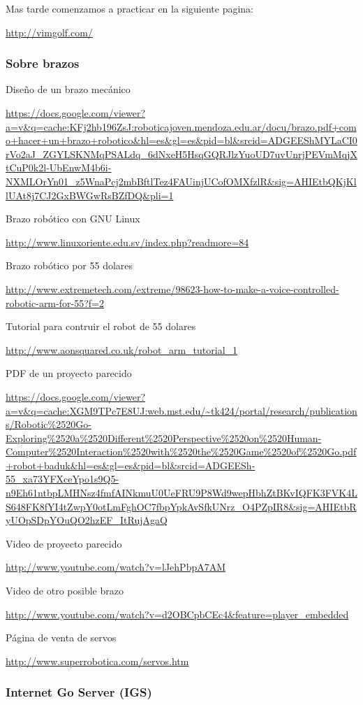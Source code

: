 \documentclass[12pt,a4paper]{report}
\begin{document}
Mas tarde comenzamos a practicar en la siguiente pagina:

\url{http://vimgolf.com/}

\subsubsection{Sobre brazos}

Diseño de un brazo mecánico

\url{https://docs.google.com/viewer?a=v&q=cache:KFj2hb196ZsJ:roboticajoven.mendoza.edu.ar/docu/brazo.pdf+como+hacer+un+brazo+robotico&hl=es&gl=es&pid=bl&srcid=ADGEEShMYLaCI0rVo2aJ_ZGYLSKNMqPSALdq_6dNxeH5HsqGQRJlzYuoUD7uvUnrjPEVmMqjXtCuP0k2l-UbEnwM4b6i-NXMLOrYn01_z5WnaPcj2mbBftlTez4FAUinjUCofOMXfzlR&sig=AHIEtbQKjKllUAt8j7CJ2GxBWGwRsBZfDQ&pli=1}

Brazo robótico con GNU  Linux

\url{http://www.linuxoriente.edu.sv/index.php?readmore=84}

Brazo robótico por 55 dolares

\url{http://www.extremetech.com/extreme/98623-how-to-make-a-voice-controlled-robotic-arm-for-55?f=2}

Tutorial para contruir el robot de 55 dolares

\url{http://www.aonsquared.co.uk/robot_arm_tutorial_1}

PDF de un proyecto parecido

\url{https://docs.google.com/viewer?a=v&q=cache:XGM9TPc7E8UJ:web.mst.edu/~tk424/portal/research/publications/Robotic%
}

Video de proyecto parecido

\url{http://www.youtube.com/watch?v=lJehPbpA7AM}

Video de otro posible brazo

\url{http://www.youtube.com/watch?v=d2OBCpbCEc4&feature=player_embedded}

Página de venta de servos

\url{http://www.superrobotica.com/servos.htm}


\subsubsection{Internet Go Server (IGS)}
\end{document}
